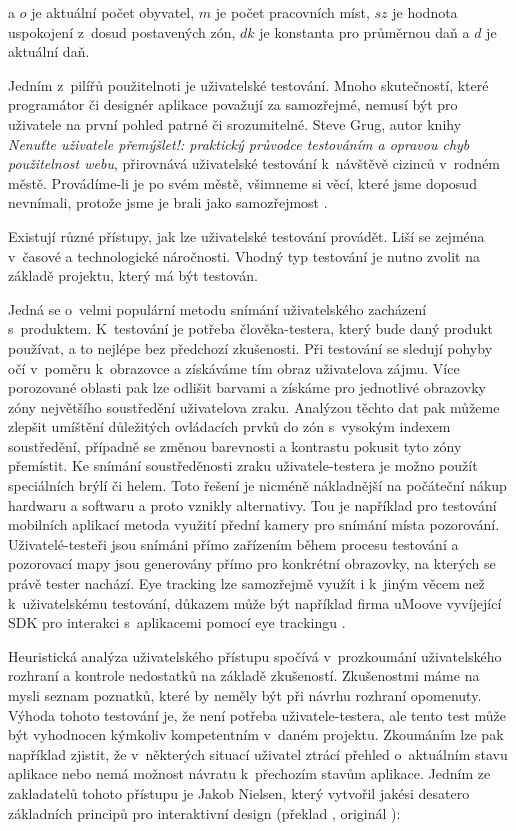 \documentclass[twoside,12pt]{article}
\begin{document}
a $o$ je aktuální počet obyvatel, $m$ je počet pracovních míst, $sz$ je hodnota uspokojení z~dosud postavených zón, $dk$ je konstanta pro průměrnou daň a $d$ je aktuální daň.

\newpage

Jedním z~pilířů použitelnoti je uživatelské testování. Mnoho skutečností, které programátor či designér aplikace považují za samozřejmé, nemusí být pro uživatele na první pohled patrné či srozumitelné. Steve Grug, autor knihy \textit{Nenuťte uživatele přemýšlet!: praktický průvodce testováním a opravou chyb použitelnost webu}, přirovnává uživatelské testování k~návštěvě cizinců v~rodném městě. Provádíme-li je po svém městě, všimneme si věcí, které jsme doposud nevnímali, protože jsme je brali jako samozřejmost \cite{krug_steve}.

Existují různé přístupy, jak lze uživatelské testování provádět. Liší se zejména v~časové a technologické náročnosti. Vhodný typ testování je nutno zvolit na základě projektu, který má být testován. 

Jedná se o~velmi populární metodu snímání uživatelského zacházení s~produktem. K~testování je potřeba člověka-testera, který bude daný produkt používat, a to nejlépe bez předchozí zkušenosti. Při testování se sledují pohyby očí v~poměru k~obrazovce a získáváme tím obraz uživatelova zájmu. Více porozované oblasti pak lze odlišit barvami a získáme pro jednotlivé obrazovky zóny největšího soustředění uživatelova zraku. Analýzou těchto dat pak můžeme zlepšit umíštění důležitých ovládacích prvků do zón s~vysokým indexem soustředění, případně se změnou barevnosti a kontrastu pokusit tyto zóny přemístit. Ke snímání soustředěnosti zraku uživatele-testera je možno použít speciálních brýlí či helem. Toto řešení je nicméně nákladnější na počáteční nákup hardwaru a softwaru a proto vznikly alternativy. Tou je například pro testování mobilních aplikací metoda využití přední kamery pro snímání místa pozorování. Uživatelé-testeři jsou snímáni přímo zařízením během procesu testování a pozorovací mapy jsou generovány přímo pro konkrétní obrazovky, na kterých se právě tester nachází. Eye tracking lze samozřejmě využít i k~jiným věcem než k~uživatelskému testování, důkazem může být například firma uMoove vyvíjející SDK pro interakci s~aplikacemi pomocí eye trackingu \cite{umoove}.

Heuristická analýza uživatelského přístupu spočívá v~prozkoumání uživatelského rozhraní a kontrole nedostatků na základě zkušeností. Zkušenostmi máme na mysli seznam poznatků, které by neměly být při návrhu rozhraní opomenuty. Výhoda tohoto testování je, že není potřeba uživatele-testera, ale tento test může být vyhodnocen kýmkoliv kompetentním v~daném projektu. Zkoumáním lze pak například zjistit, že v~některých situací uživatel ztrácí přehled o~aktuálním stavu aplikace nebo nemá možnost návratu k~přechozím stavům aplikace. Jedním ze zakladatelů tohoto přístupu je Jakob Nielsen, který vytvořil jakési desatero základních principů pro interaktivní design (překlad \cite{lichnovskakarberova}, originál \cite{nielsen}): 
\end{document}
